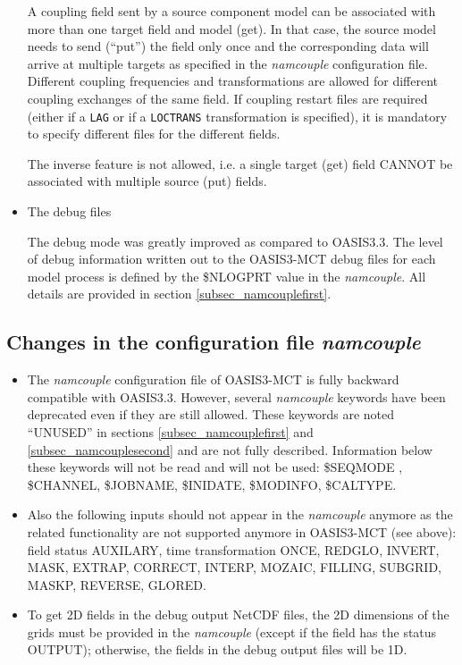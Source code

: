 \begin{itemize}
  A coupling field sent by a source component model can be associated
  with more than one target field and model (get). In that case, the
  source model needs to send (``put'') the field only once and the
  corresponding data will arrive at multiple targets as specified in
  the {\it namcouple} configuration file. Different coupling
  frequencies and transformations are allowed for different coupling
  exchanges of the same field. If coupling restart files are required
  (either if a {\tt LAG} or if a {\tt LOCTRANS} transformation is
  specified), it is mandatory to specify different files for the
  different fields.

The inverse feature is not allowed, i.e. a single target (get) field
CANNOT be associated with multiple source (put) fields.

\item The debug files

The debug mode was greatly improved as compared to OASIS3.3. The level
of debug information written out to the OASIS3-MCT debug files for
each model process is defined by the \$NLOGPRT value in the {\it
  namcouple}. All details are provided in section
\ref{subsec_namcouplefirst}.

\end{itemize}

\subsection{Changes in the configuration file {\it namcouple}}
\label{sec_changes_namcouple}

\begin{itemize}

\item The {\it namcouple} configuration file of OASIS3-MCT is fully backward
compatible with OASIS3.3. However, several {\it namcouple} keywords
have been deprecated even if they are still 
allowed.  These keywords are noted ``UNUSED'' in sections
\ref{subsec_namcouplefirst} and \ref{subsec_namcouplesecond} and are
not fully described. Information below these keywords will not be read
and will not be used: \$SEQMODE , \$CHANNEL, \$JOBNAME, \$INIDATE,
\$MODINFO, \$CALTYPE.

\item Also the following inputs should not appear in the {\it namcouple}
anymore as the related functionality are not supported anymore in
OASIS3-MCT (see above): field status AUXILARY, time transformation
ONCE, REDGLO, INVERT, MASK, EXTRAP, CORRECT, INTERP, MOZAIC, FILLING,
SUBGRID, MASKP, REVERSE, GLORED. 

\item To get 2D fields in the debug output NetCDF files, the 2D dimensions of the
  grids must be provided in the {\it namcouple} (except if the field
  has the status OUTPUT); otherwise, the fields in the debug output files will be 1D.

\end{itemize}

